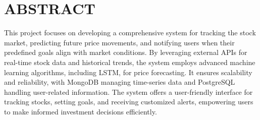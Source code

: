 \chapter*{ABSTRACT}
This project focuses on developing a comprehensive system for tracking the stock market, predicting future price movements, and notifying users when their predefined goals align with market conditions. By leveraging external APIs for real-time stock data and historical trends, the system employs advanced machine learning algorithms, including LSTM, for price forecasting. It ensures scalability and reliability, with MongoDB managing time-series data and PostgreSQL handling user-related information. The system offers a user-friendly interface for tracking stocks, setting goals, and receiving customized alerts, empowering users to make informed investment decisions efficiently.

\vspace{1cm}
